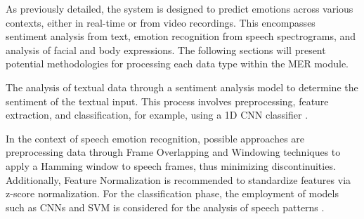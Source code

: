 \documentclass[runningheads]{llncs}
\begin{document}
As previously detailed, the system is designed to predict emotions across various contexts, either in real-time or from video recordings. This encompasses sentiment analysis from text, emotion recognition from speech spectrograms, and analysis of facial and body expressions. The following sections will present potential methodologies for processing each data type within the MER module.

The analysis of textual data through a sentiment analysis model to determine the sentiment of the textual input. This process involves preprocessing, feature extraction, and classification, for example, using a 1D CNN classifier \cite{hung_beyond_2023}.

In the context of speech emotion recognition, possible approaches are preprocessing data through Frame Overlapping and Windowing techniques to apply a Hamming window to speech frames, thus minimizing discontinuities. Additionally, Feature Normalization is recommended to standardize features via z-score normalization. For the classification phase, the employment of models such as CNNs and SVM is considered for the analysis of speech patterns \cite{Ayadi2011, Badshah2017}.
\end{document}
